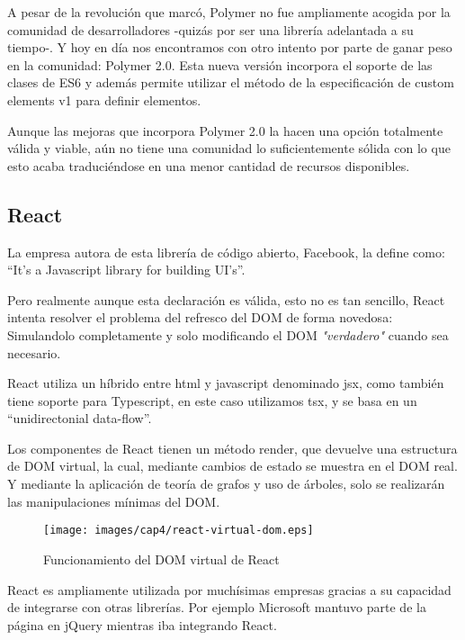\bigskip
A pesar de la revolución que marcó, Polymer no fue ampliamente acogida por la comunidad de desarrolladores 
-quizás por ser una librería adelantada a su tiempo-. Y hoy en día nos encontramos con otro intento por 
parte de ganar peso en la comunidad: Polymer 2.0. Esta nueva versión incorpora el soporte de las clases de ES6
y además permite utilizar el método de la especificación de custom elements v1 para definir elementos.

\bigskip
Aunque las mejoras que incorpora Polymer 2.0 la hacen una opción totalmente válida y viable, aún no 
tiene una comunidad lo suficientemente sólida con lo que esto acaba traduciéndose en una menor 
cantidad de recursos disponibles.

\subsection{React}
La empresa autora de esta librería de código abierto, Facebook, la define como: “It’s a Javascript library for building UI’s”. \cite{React}

\bigskip
Pero realmente aunque esta declaración es válida, esto no es tan sencillo, React intenta resolver el problema
 del refresco del DOM de forma novedosa: Simulandolo completamente y solo modificando el DOM \textit{"verdadero"} cuando sea necesario.

\bigskip
React utiliza un híbrido entre html y javascript denominado jsx, como también tiene soporte para 
Typescript, en este caso utilizamos tsx, y se basa en un “unidirectonial data-flow”. 

\bigskip
Los componentes de React tienen un método render, que devuelve una estructura de DOM virtual, la cual, 
mediante cambios de estado se muestra en el DOM real. Y mediante la aplicación de teoría de grafos y uso de árboles,
solo se realizarán las manipulaciones mínimas del DOM.

\begin{figure}[!th]
\begin{center}
\texttt{[image: images/cap4/react-virtual-dom.eps]}
\caption{Funcionamiento del DOM virtual de React}
\label{fig:Funcionamiento del DOM virtual de React}
\end{center}
\end{figure}


\bigskip
React es ampliamente utilizada por muchísimas empresas gracias a su capacidad de integrarse con otras librerías. 
Por ejemplo Microsoft mantuvo parte de la página en jQuery mientras iba integrando React.

